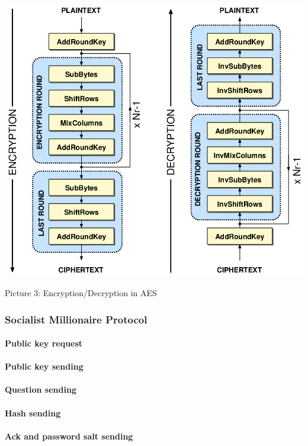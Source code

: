 \documentclass[a4paper,12pt]{article}
\begin{document}
\begin{center}
\vspace{2cm}
\includegraphics[scale=0.3]{images/aes}

\vspace{0.5cm}
Picture 3: Encryption/Decryption in AES\\
\end{center}
\clearpage
\subsubsection{Socialist Millionaire Protocol}
\paragraph{Public key request}
\paragraph{Public key sending}
\paragraph{Question sending}
\paragraph{Hash sending}
\paragraph{Ack and password salt sending}
\end{document}
